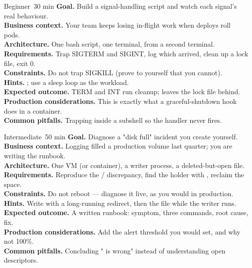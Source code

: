 \begin{minilab}{Beginner}{~30 min}
\textbf{Goal.} Build a signal-handling script and watch each signal's real behaviour.\\
\textbf{Business context.} Your team keeps losing in-flight work when deploys roll pods.\\
\textbf{Architecture.} One bash script, one terminal,  from a second terminal.\\
\textbf{Requirements.} Trap SIGTERM and SIGINT, log which arrived, clean up a lock file, exit 0.\\
\textbf{Constraints.} Do not trap SIGKILL (prove to yourself that you cannot).\\
\textbf{Hints.} ; use a sleep loop as the workload.\\
\textbf{Expected outcome.} TERM and INT run cleanup;  leaves the lock file behind.\\
\textbf{Production considerations.} This is exactly what a graceful-shutdown hook does in a container.\\
\textbf{Common pitfalls.} Trapping inside a subshell so the handler never fires.
\end{minilab}

\begin{minilab}{Intermediate}{~50 min}
\textbf{Goal.} Diagnose a "disk full" incident you create yourself.\\
\textbf{Business context.} Logging filled a production volume last quarter; you are writing the runbook.\\
\textbf{Architecture.} One VM (or container), a writer process, a deleted-but-open file.\\
\textbf{Requirements.} Reproduce the / discrepancy, find the holder with , reclaim the space.\\
\textbf{Constraints.} Do not reboot --- diagnose it live, as you would in production.\\
\textbf{Hints.} Write with a long-running redirect, then  the file while the writer runs.\\
\textbf{Expected outcome.} A written runbook: symptom, three commands, root cause, fix.\\
\textbf{Production considerations.} Add the alert threshold you would set, and why not 100\%.\\
\textbf{Common pitfalls.} Concluding " is wrong" instead of understanding open descriptors.
\end{minilab}

